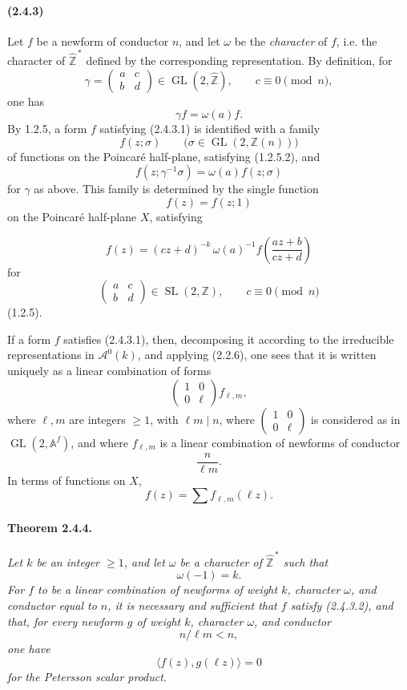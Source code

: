 \documentclass[10pt,a4paper]{article}
\providecommand{\GL}{\operatorname{GL}}
\providecommand{\SL}{\operatorname{SL}}
\providecommand{\Z}{\mathbb Z}
\providecommand{\Af}{\mathbb A^f}
\begin{document}
\paragraph{(2.4.3)} Let \(f\) be a newform of conductor \(n\), and let \(\omega\) be the \emph{character} of \(f\), i.e. the character of \(\widehat{\Z}^{\,*}\) defined by the corresponding representation. By definition, for
\[
\gamma=\begin{pmatrix}a&c\\ b&d\end{pmatrix}\in\GL(2,\widehat{\Z}),
\qquad c\equiv0\pmod n,
\]
one has
\[
\tag{2.4.3.1}
\gamma f=\omega(a)f.
\]
By 1.2.5, a form \(f\) satisfying (2.4.3.1) is identified with a family
\[
f(z;\sigma)\qquad \bigl(\sigma\in\GL(2,\Z(n))\bigr)
\]
of functions on the Poincaré half-plane, satisfying (1.2.5.2), and
\[
f(z;\gamma^{-1}\sigma)=\omega(a)f(z;\sigma)
\]
for \(\gamma\) as above. This family is determined by the single function
\[
f(z)=f(z;1)
\]
on the Poincaré half-plane \(X\), satisfying

\clearpage
{}
\hypertarget{authority-32}{}
\[
\tag{2.4.3.2}
f(z)=(cz+d)^{-k}\,\omega(a)^{-1}
f\!\left(\frac{az+b}{cz+d}\right)
\]
for
\[
\begin{pmatrix}a&c\\ b&d\end{pmatrix}\in\SL(2,\Z),
\qquad c\equiv0\pmod n
\]
(1.2.5).

If a form \(f\) satisfies (2.4.3.1), then, decomposing it according to the irreducible representations in \(\mathcal A^0(k)\), and applying (2.2.6), one sees that it is written uniquely as a linear combination of forms
\[
\begin{pmatrix}1&0\\0&\ell\end{pmatrix}f_{\ell,m},
\]
where \(\ell,m\) are integers \(\ge1\), with \(\ell m\mid n\), where \(\begin{pmatrix}1&0\\0&\ell\end{pmatrix}\) is considered as in \(\GL(2,\Af)\), and where \(f_{\ell,m}\) is a linear combination of newforms of conductor
\[
\frac{n}{\ell m}.
\]
In terms of functions on \(X\),
\[
\tag{2.4.3.3}
f(z)=\sum f_{\ell,m}(\ell z).
\]

\paragraph{Theorem 2.4.4.}{\itshape  Let \(k\) be an integer \(\ge1\), and let \(\omega\) be a character of \(\widehat{\Z}^{\,*}\) such that
\[
\omega(-1)=k.
\]
For \(f\) to be a linear combination of newforms of weight \(k\), character \(\omega\), and conductor equal to \(n\), it is necessary and sufficient that \(f\) satisfy (2.4.3.2), and that, for every newform \(g\) of weight \(k\), character \(\omega\), and conductor
\[
n/\ell m<n,
\]
one have
\[
\langle f(z),g(\ell z)\rangle=0
\]
for the Petersson scalar product.\par}
\end{document}
